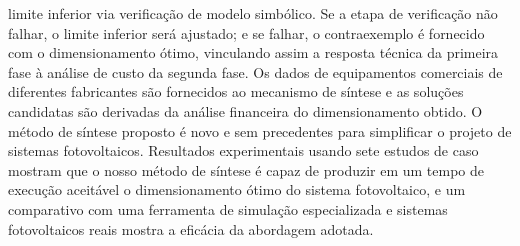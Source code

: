 limite inferior via verificação de modelo simbólico. Se a etapa de verificação não falhar, o limite inferior será ajustado; e se falhar, o contraexemplo é fornecido com o dimensionamento ótimo, vinculando assim a resposta técnica da primeira fase à análise de custo da segunda fase. Os dados de equipamentos comerciais de diferentes fabricantes são fornecidos ao mecanismo de síntese e as soluções candidatas são derivadas da análise financeira do dimensionamento obtido. O método de síntese proposto é novo e sem precedentes para simplificar o projeto de sistemas fotovoltaicos. Resultados experimentais usando sete estudos de caso mostram que o nosso método de síntese é capaz de produzir em um tempo de execução aceitável o dimensionamento ótimo do sistema fotovoltaico, e um comparativo com uma ferramenta de simulação especializada e sistemas fotovoltaicos reais mostra a eficácia da abordagem adotada.
